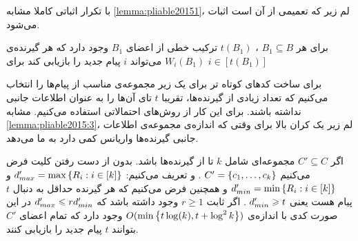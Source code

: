 با تکرار اثباتی کاملا مشابه
\autoref{lemma:pliable20151}، لم زیر که تعمیمی از آن است اثبات می‌شود.
\begin{lemma}
    برای هر
    $B_1 \subseteq B$
    ،
    $t(B_1)$
    ترکیب خطی از اعضای
    $B_1$
    وجود دارد که هر گیرنده‌ی
    $W_i(B_1)$
    می‌تواند
    $i$
    پیام جدید را بازیابی کند برای
    $i \in [t(B_1)]$
\end{lemma}
برای ساخت کدهای کوتاه تر برای
یک زیر مجموعه‌ی مناسب از پیام‌ها را انتخاب می‌کنیم که تعداد زیادی از گیرنده‌ها، تقریبا
$t$
تای آن‌ها را به عنوان اطلاعات جانبی نداشته باشند. برای این کار از روش‌های احتمالاتی استفاده می‌کنیم. مشابه
\autoref{lemma:pliable2015:3}، لم زیر یک کران بالا برای وقتی که اندازه‌ی مجموعه‌ی اطلاعات جانبی گیرنده‌ها واریانس کمی دارد به ما می‌دهد.
\begin{lemma}
    \label{lemma:pliable2015:6}
    اگر
    $C' \subseteq C$
    مجموعه‌ای شامل
    $k$
    تا از گیرنده‌‌ها باشد. بدون از دست رفتن کلیت فرض می‌کنیم
    $C' = \left\{ c_1, \ldots, c_k \right\}$
    . و تعریف می‌کنیم:
    $d_{max}' = \max\left\{ R_i: i \in [k]  \right\}$
    و
    $d_{min}' = \min\left\{ R_i: i \in [k]  \right\}$
    و همچنین فرض می‌کنیم که هر گیرنده حداقل به دنبال
    $t$
    پیام هست یعنی
    $d_{min}' \geqslant t$
    . اگر ثابت
    $r \geq 1$
    وجود داشته باشد که
    $d_{max}' \leqslant r d_{min}'$
    در این صورت کدی با اندازه‌ی
    $O(\min\left\{ t \log(k), t + \log^2 k \right\})$
    وجود دارد که تمام اعضای
    $C'$
    بتوانند
    $t$
    پیام جدید را بازیابی کنند.
\end{lemma}
